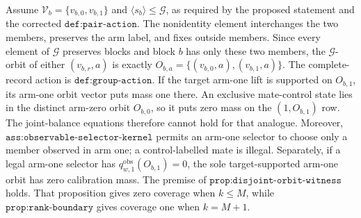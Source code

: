 Assume \(\mathcal V_b=\{v_{b,0},v_{b,1}\}\) and \(\langle s_b\rangle\le\mathcal G\), as required by the proposed statement and the corrected \(\texttt{def:pair-action}\). The nonidentity element interchanges the two members, preserves the arm label, and fixes outside members. Since every element of \(\mathcal G\) preserves blocks and block \(b\) has only these two members, the \(\mathcal G\)-orbit of either \((v_{b,r},a)\) is exactly \(O_{b,a}=\{(v_{b,0},a),(v_{b,1},a)\}\). The complete-record action is \(\texttt{def:group-action}\). If the target arm-one lift is supported on \(O_{b,1}\), its arm-one orbit vector puts mass one there. An exclusive mate-control state lies in the distinct arm-zero orbit \(O_{b,0}\), so it puts zero mass on the \((1,O_{b,1})\) row. The joint-balance equations therefore cannot hold for that analogue. Moreover, \(\texttt{ass:observable-selector-kernel}\) permits an arm-one selector to choose only a member observed in arm one; a control-labelled mate is illegal. Separately, if a legal arm-one selector has \(q^{\mathrm{obs}}_{w,1}(O_{b,1})=0\), the sole target-supported arm-one orbit has zero calibration mass. The premise of \(\texttt{prop:disjoint-orbit-witness}\) holds. That proposition gives zero coverage when \(k\le M\), while \(\texttt{prop:rank-boundary}\) gives coverage one when \(k=M+1\).